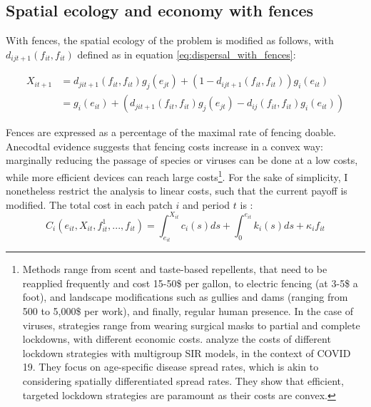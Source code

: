 \subsection{Spatial ecology and economy with fences}

With fences, the spatial ecology of the problem is modified as follows, with $d_{ijt+1}(f_{it}, f_{it})$ defined as in equation \ref{eq:dispersal_with_fences}: 

\begin{align}
X_{it+1} &=  d_{jit+1}(f_{it}, f_{it}) g_j(e_{jt}) + \left(1 - d_{ijt+1}(f_{it}, f_{it})\right)g_i(e_{it}) \nonumber \\
& = g_i(e_{it}) + \left( d_{jit+1}(f_{it}, f_{it}) g_j(e_{jt}) - d_{ij}(f_{it}, f_{it}) g_i(e_{it}) \right)
\end{align}

Fences are expressed as a percentage of the maximal rate of fencing doable. Anecodtal evidence suggests that fencing costs increase in a convex way: marginally reducing the passage of species or viruses can be done at a low costs, while more efficient devices can reach large costs\footnote{Methods range from scent and taste-based repellents, that need to be reapplied frequently and cost 15-50\$ per gallon, to electric fencing (at 3-5\$ a foot), and landscape modifications such as gullies and dams (ranging from 500 to 5,000\$ per work), and finally, regular human presence. In the case of viruses, strategies range from wearing surgical masks to partial and complete lockdowns, with different economic costs. \cite{gollier2020cost, acemoglu_optimal_2021} analyze the costs of different lockdown strategies with multigroup SIR models, in the context of COVID 19. They focus on age-specific disease spread rates, which is akin to considering spatially differentiated spread rates. They show that efficient, targeted lockdown strategies are paramount as their costs are convex.}. For the sake of simplicity, I nonetheless restrict the analysis to linear costs, such that the current payoff is modified. The total cost in each patch $i$ and period $t$ is : 
\begin{equation}
C_i(e_{it}, X_{it}, f_{it}^1, ..., f_{it}) = \int_{e_{it}}^{X_{it}}c_i(s)ds + \int_{0}^{e_{it}}k_i(s)ds  +  \kappa_i f_{it}
\end{equation}



















